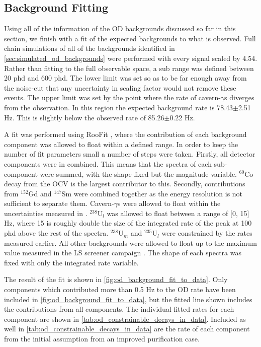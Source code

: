 \subsection{Background Fitting}
\par
Using all of the information of the OD backgrounds discussed so far in this section, we finish with a fit of the expected backgrounds to what is observed.
Full chain simulations of all of the backgrounds identified in \autoref{sec:simulated_od_backgrounds} were performed with every signal scaled by 4.54.
Rather than fitting to the full observable space, a sub range was defined between 20 phd and 600 phd.
The lower limit was set so as to be far enough away from the noise-cut that any uncertainty in scaling factor would not remove these events.
The upper limit was set by the point where the rate of cavern-$\gamma$s diverges from the observation.
In this region the expected background rate is 78.43$\pm$2.51 Hz.
This is slightly below the observed rate of 85.26$\pm$0.22 Hz.
\par
A fit was performed using RooFit \cite{roostats_ref}, where the contribution of each background component was allowed to float within a defined range.
In order to keep the number of fit parameters small a number of steps were taken.
Firstly, all detector components were in combined.
This means that the spectra of each sub-component were summed, with the shape fixed but the magnitude variable.
${}^{60}$Co decay from the OCV is the largest contributor to this.
Secondly, contributions from ${}^{152}$Gd and ${}^{147}$Sm were combined together as the energy resolution is not sufficient to separate them.
Cavern-$\gamma$s were allowed to float within the uncertainties measured in \cite{LZ_Gamma_Ray_Background_ref}.
${}^{238}$U$_l$ was allowed to float between a range of [0, 15] Hz, where 15 is roughly double the size of the integrated rate of the peak at 100 phd above the rest of the spectra.
${}^{238}$U$_{m}$ and ${}^{235}$U$_{l}$ were constrained by the rates measured earlier.
All other backgrounds were allowed to float up to the maximum value measured in the LS screener campaign \cite{scotthaselschwardt_thesis_ref}.
The shape of each spectra was fixed with only the integrated rate variable.
\par
The result of the fit is shown in \autoref{fig:od_background_fit_to_data}.
Only components which contributed more than 0.5 Hz to the OD rate have been included in \autoref{fig:od_background_fit_to_data}, but the fitted line shown includes the contributions from all components.
The individual fitted rates for each component are shown in \autoref{tab:od_constrainable_decays_in_data}.
Included as well in \autoref{tab:od_constrainable_decays_in_data} are the rate of each component from the initial assumption from an improved purification case.

